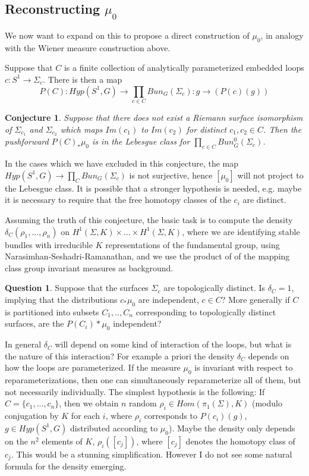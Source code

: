 \documentclass{amsart}
\theoremstyle{conjecture}
\newtheorem{conjecture}{Conjecture}
\theoremstyle{definition}
\theoremstyle{question}
\newtheorem{question}{Question}
\theoremstyle{questions}
\theoremstyle{remark}
\theoremstyle{remarks}
\theoremstyle{example}
\numberwithin{equation}{section}
\begin{document}
\subsection{Reconstructing $\mu_0$}

We now want to expand on this to propose a direct construction of $\mu_0$, in analogy with the Wiener measure construction above.

Suppose that $C$ is a finite collection of analytically parameterized embedded loops $c:S^1 \to \Sigma_c$. There is then a map
$$P(C):Hyp(S^1,G) \to \prod_{c\in C} Bun_G(\Sigma_c):g \to (P(c)(g)) $$


\begin{conjecture}\label{conj41}  Suppose that there does not exist a Riemann surface isomorphism of $\Sigma_{c_1}$ and $\Sigma_{c_2}$ which maps $Im(c_1)$ to $Im(c_2)$ for distinct $c_1,c_2\in C$. Then the pushforward $P(C)_*\mu_0$ is in the Lebesgue class for $\prod_{c\in C} Bun_G^0(\Sigma_c)$.
\end{conjecture}

In the cases which we have excluded in this conjecture, the map $Hyp(S^1,G) \to \prod_C Bun_G(\Sigma_c)$ is not surjective, hence $[\mu_0]$ will not project to the Lebesgue class. It is possible that a stronger hypothesis is needed, e.g. maybe it is necessary to require that the free homotopy classes of the $c_i$ are distinct.

Assuming the truth of this conjecture, the basic task is to compute the density $\delta_C(\rho_1,...,\rho_n)$ on $H^1(\Sigma,K)\times ...\times H^1(\Sigma,K)$, where we are identifying stable bundles with irreducible $K$ representations of the fundamental group, using Narasimhan-Seshadri-Ramanathan, and we use the product of
of the mapping class group invariant measures as background.


\begin{question}\label{ques41} Suppose that the surfaces $\Sigma_c$ are topologically distinct. Is $\delta_C=1$, implying that the distributions $c_*\mu_0$ are independent, $c\in C$? More generally if $C$ is partitioned into
subsets $C_1,..,C_n$ corresponding to topologically distinct surfaces, are the $P(C_i)*\mu_0$ independent?

\end{question}

In general $\delta_C$ will depend on some kind of interaction of the loops, but what is the nature of this interaction? For example a priori the density $\delta_C$ depends on how the loops are parameterized. If the measure $\mu_0$ is invariant with respect to reparameterizations, then one can simultaneously reparameterize all of them, but not necessarily individually. The simplest hypothesis is the following: If $C=\{c_1,...,c_n\}$, then we obtain
$n$ random $\rho_i\in Hom(\pi_1(\Sigma),K)$ (modulo conjugation by $K$ for each $i$, where $\rho_i$ corresponds to $P(c_i)(g)$,
$g\in Hyp(S^1,G)$ distributed according to $\mu_0$). Maybe the density only depends on the $n^2$ elements of $K$, $\rho_i([c_j])$, where $[c_j]$ denotes the homotopy class of $c_j$. This would be a stunning simplification. However I do not see some natural formula for the density emerging.
\end{document}
